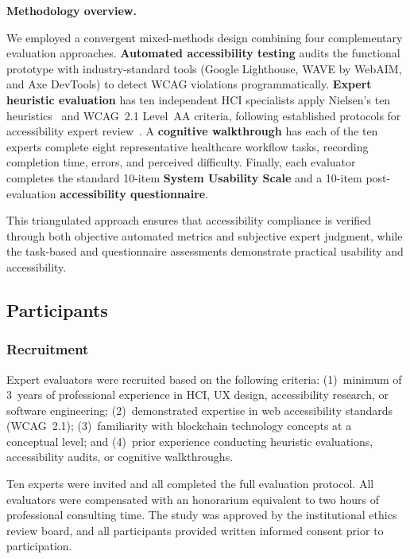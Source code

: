 \documentclass[journal,onecolumn]{IEEEtran}
\begin{document}
\noindent\textbf{Methodology overview.}

We employed a convergent mixed-methods design\cite{creswell2017research}
combining four complementary evaluation approaches. \textbf{Automated accessibility testing} audits the functional prototype with industry-standard tools (Google Lighthouse, WAVE by WebAIM, and Axe DevTools) to detect WCAG violations programmatically. \textbf{Expert heuristic evaluation} has ten independent HCI specialists apply Nielsen's ten heuristics~\cite{nielsen1994usability} and WCAG~2.1 Level~AA criteria, following established protocols for accessibility expert review~\cite{paz2019heuristic}. A \textbf{cognitive walkthrough} has each of the ten experts complete eight representative healthcare workflow tasks, recording completion time, errors, and perceived difficulty. Finally, each evaluator completes the standard 10-item \textbf{System Usability Scale} and a 10-item post-evaluation \textbf{accessibility questionnaire}.

This triangulated approach ensures that accessibility compliance is
verified through both objective automated metrics and subjective expert
judgment, while the task-based and questionnaire assessments demonstrate
practical usability and accessibility.

\subsection{Participants}
\label{subsec:participants}

\subsubsection{Recruitment}
\label{subsec:recruitment}

Expert evaluators were recruited based on the following criteria:
(1)~minimum of 3~years of professional experience in HCI, UX design,
accessibility research, or software engineering; (2)~demonstrated
expertise in web accessibility standards (WCAG~2.1); (3)~familiarity
with blockchain technology concepts at a conceptual level; and
(4)~prior experience conducting heuristic evaluations, accessibility
audits, or cognitive walkthroughs.

Ten experts were invited and all completed the full evaluation
protocol. All evaluators were compensated with an honorarium equivalent
to two hours of professional consulting time. The study was approved by
the institutional ethics review board, and all participants provided
written informed consent prior to participation.
\end{document}
